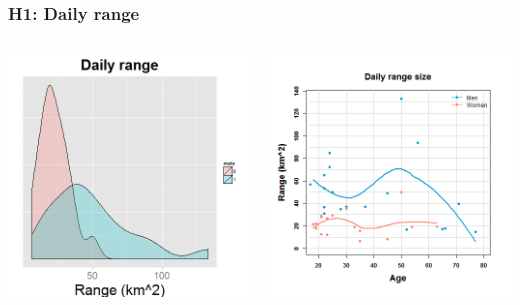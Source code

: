 \documentclass{beamer}
\begin{document}
\begin{frame}
\frametitle{H1: Daily range}

\begin{columns}
\begin{column}{.5\textwidth}
\includegraphics[width= 1\textwidth]{mobrng_sex}
\end{column}

\begin{column}{.5\textwidth}
\includegraphics[width= 1.1\textwidth]{dailyage}
\end{column}

\end{columns}

\end{frame}
\end{document}

